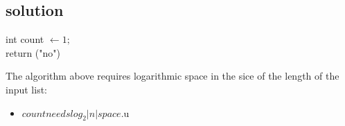
% 
% 
% 
% 
% 
% 
% 

\subsection{solution}

\begin{algorithm}[H]
		int count $\leftarrow 1;$\\
		 {
		}
		return ("no")
	\label{alg:n-sorted}
\end{algorithm}%

The algorithm above requires logarithmic space in the sice of the length of the input list:\\
\newline
\begin{itemize}
 \item $ count needs log_2|n| space.$u
\end{itemize}



